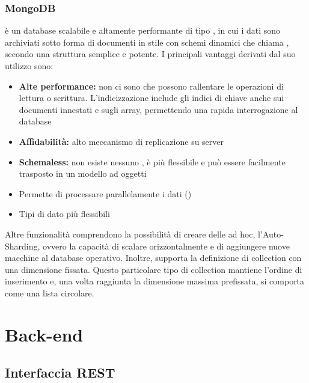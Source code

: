 \documentclass[12pt,a4paper]{article}
\begin{document}
\subsubsection{MongoDB}\label{mongodb}
 è un database   scalabile e altamente performante di tipo , in cui i dati sono archiviati sotto forma di documenti in stile  con
schemi dinamici che  chiama , secondo una struttura semplice e potente.
I principali vantaggi derivati dal suo utilizzo sono:
\begin{itemize}
	\item \textbf{Alte performance:} non ci sono  che possono rallentare le operazioni di lettura o scrittura. L’indicizzazione include gli indici di chiave anche sui documenti innestati e sugli array, permettendo una rapida interrogazione al database
	\item \textbf{Affidabilità:} alto meccanismo di replicazione su server
	\item \textbf{Schemaless:} non esiste nessuno , è più flessibile e può essere facilmente trasposto in un modello ad oggetti
	\item Permette di processare parallelamente i dati ()
	\item Tipi di dato più flessibili
\end{itemize}
Altre funzionalità comprendono la possibilità di creare delle  ad hoc, l’Auto-Sharding, ovvero la capacità di scalare orizzontalmente e di aggiungere nuove macchine al database operativo.
Inoltre,  supporta la definizione di collection con una dimensione fissata. Questo particolare tipo di collection mantiene l’ordine di inserimento e, una volta raggiunta la dimensione massima prefissata, si comporta come una lista circolare.


\newpage
\section{Back-end}

\subsection{Interfaccia REST}
\end{document}
